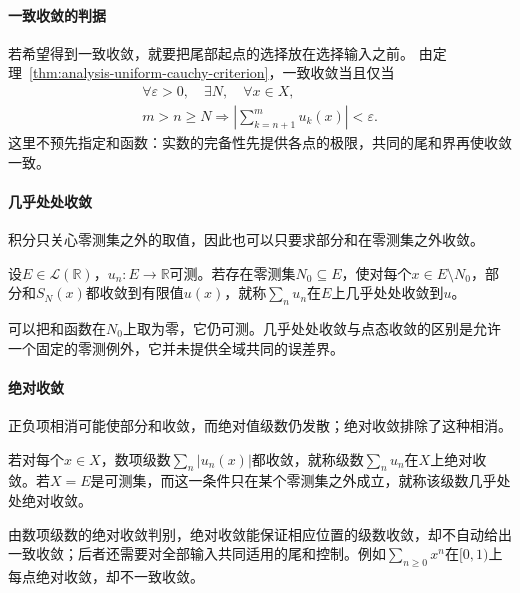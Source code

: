 \paragraph{一致收敛的判据}
若希望得到一致收敛，就要把尾部起点的选择放在选择输入之前。
由定理~\ref{thm:analysis-uniform-cauchy-criterion}，一致收敛当且仅当
\[
 \begin{gathered}
 \forall\varepsilon>0,\quad\exists N,\quad\forall x\in X,\\
 m>n\geq N\Longrightarrow
 \left|\sum_{k=n+1}^{m}u_k(x)\right|<\varepsilon.
 \end{gathered}
\]
这里不预先指定和函数：实数的完备性先提供各点的极限，共同的尾和界再使收敛一致。

\paragraph{几乎处处收敛}
积分只关心零测集之外的取值，因此也可以只要求部分和在零测集之外收敛。
\begin{definition}[函数项级数的几乎处处收敛]
\label{def:analysis-series-almost-everywhere-convergence}
设$E\in\mathcal L(\mathbb R)$，$u_n:E\to\mathbb R$可测。若存在零测集$N_0\subseteq E$，使对每个$x\in E\setminus N_0$，部分和$S_N(x)$都收敛到有限值$u(x)$，就称$\sum_nu_n$在$E$上几乎处处收敛到$u$。
\end{definition}
可以把和函数在$N_0$上取为零，它仍可测。几乎处处收敛与点态收敛的区别是允许一个固定的零测例外，它并未提供全域共同的误差界。

\paragraph{绝对收敛}
正负项相消可能使部分和收敛，而绝对值级数仍发散；绝对收敛排除了这种相消。
\begin{definition}[函数项级数的绝对收敛]
\label{def:analysis-series-absolute-convergence}
若对每个$x\in X$，数项级数$\sum_n|u_n(x)|$都收敛，就称级数$\sum_nu_n$在$X$上绝对收敛。若$X=E$是可测集，而这一条件只在某个零测集之外成立，就称该级数几乎处处绝对收敛。
\end{definition}
由数项级数的绝对收敛判别，绝对收敛能保证相应位置的级数收敛，却不自动给出一致收敛；后者还需要对全部输入共同适用的尾和控制。例如$\sum_{n\geq0}x^n$在$[0,1)$上每点绝对收敛，却不一致收敛。


